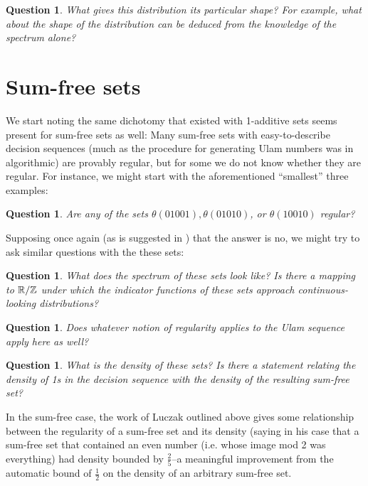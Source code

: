 \documentclass{report}
\newtheorem{question}[theorem]{Question}
\theoremstyle{remark}
\numberwithin{equation}{section}
\begin{document}
\begin{question}\label{qn:shape}
  What gives this distribution its particular shape?  For example,
  what about the shape of the distribution can be deduced from the
  knowledge of the spectrum alone?
\end{question}

\section{Sum-free sets}

We start noting the same dichotomy that existed with 1-additive sets
seems present for sum-free sets as well: Many sum-free sets with
easy-to-describe decision sequences (much as the procedure for
generating Ulam numbers was in algorithmic) are provably regular, but
for some we do not know whether they are regular.  For instance, we
might start with the aforementioned ``smallest'' three examples:

\begin{question}\label{qn:sumfree_regularity}
  Are any of the sets $\theta(01001), \theta(01010)$, or
  $\theta(10010)$ regular?
\end{question}

Supposing once again (as is suggested in
\cite{calkin:int2005}) that the answer is no, we might try
to ask similar questions with the these sets:

\begin{question}\label{qn:sumfree_spectrum}
  What does the spectrum of these sets look like?  Is there a mapping
  to $\mathbb{R}/\mathbb{Z}$ under which the indicator functions of these sets
  approach continuous-looking distributions?
\end{question}

\begin{question}\label{qn:sumfree_new_regularity}
  Does whatever notion of regularity applies to the Ulam sequence
  apply here as well?
\end{question}

\begin{question}\label{qn:sumfree_density}
  What is the density of these sets?  Is there a statement relating
  the density of 1s in the decision sequence with the density of the
  resulting sum-free set?
\end{question}

In the sum-free case, the work of Luczak outlined above gives some
relationship between the regularity of a sum-free set and its density
(saying in his case that a sum-free set that contained an even number
(i.e. whose image mod 2 was everything) had density bounded by
$\frac25$--a meaningful improvement from the automatic bound of
$\frac12$ on the density of an arbitrary sum-free set.
\end{document}
